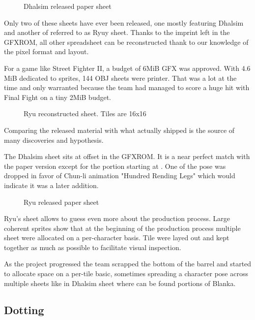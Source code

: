 \begin{figure}[H]
\caption*{Dhalsim released paper sheet}
\end{figure}

Only two of these sheets have ever been released, one mostly featuring Dhalsim\cite{ffdevinterview} and another of referred to as Ryuy sheet\cite{htmcc}. Thanks to the imprint left in the GFXROM, all other spreadsheet can be reconstructed thank to our knowledge of the pixel format and layout. 



For a game like Street Fighter II, a budget of 6MiB GFX was approved. With 4.6 MiB dedicated to sprites, 144 OBJ sheets were printer. That was a lot at the time and only warranted because the team had managed to score a huge hit with Final Fight on a tiny 2MiB budget. 




 \begin{figure}[H]
\caption*{Ryu reconstructed sheet. Tiles are 16x16}
\end{figure}


Comparing the released material with what actually shipped is the source of many discoveries and hypothesis. 

The Dhalsim sheet sits at offset  in the GFXROM. It is a near perfect match with the paper version except for the portion starting at . One of the pose was dropped in favor of Chun-li animation "Hundred Rending Legs" which would indicate it was a later addition. 

 \begin{figure}[H]
\caption*{Ryu released paper sheet}
\end{figure}

Ryu's sheet  allows to guess even more about the production process. Large coherent sprites show that at the beginning of the production process multiple sheet were allocated on a per-character basis. Tile were layed out and kept together as much as possible to facilitate visual inspection.

As the project progressed the team scrapped the bottom of the barrel and started to allocate space on a per-tile basic, sometimes spreading a character pose across multiple sheets like in Dhalsim sheet where can be found portions of Blanka.


\subsection{Dotting}


